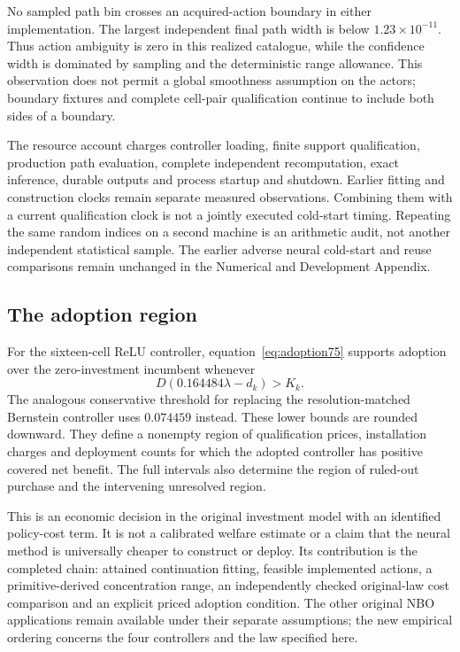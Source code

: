 No sampled path bin crosses an acquired-action boundary in either implementation. The largest independent final path width is below $1.23\times10^{-11}$. Thus action ambiguity is zero in this realized catalogue, while the confidence width is dominated by sampling and the deterministic range allowance. This observation does not permit a global smoothness assumption on the actors; boundary fixtures and complete cell-pair qualification continue to include both sides of a boundary.



The resource account charges controller loading, finite support qualification, production path evaluation, complete independent recomputation, exact inference, durable outputs and process startup and shutdown. Earlier fitting and construction clocks remain separate measured observations. Combining them with a current qualification clock is not a jointly executed cold-start timing. Repeating the same random indices on a second machine is an arithmetic audit, not another independent statistical sample. The earlier adverse neural cold-start and reuse comparisons remain unchanged in the Numerical and Development Appendix.

\subsection{The adoption region}
For the sixteen-cell ReLU controller, equation~\eqref{eq:adoption75} supports adoption over the zero-investment incumbent whenever
\[
 D(0.164484\lambda-d_k)>K_k.
\]
The analogous conservative threshold for replacing the resolution-matched Bernstein controller uses $0.074459$ instead. These lower bounds are rounded downward. They define a nonempty region of qualification prices, installation charges and deployment counts for which the adopted controller has positive covered net benefit. The full intervals also determine the region of ruled-out purchase and the intervening unresolved region.

This is an economic decision in the original investment model with an identified policy-cost term. It is not a calibrated welfare estimate or a claim that the neural method is universally cheaper to construct or deploy. Its contribution is the completed chain: attained continuation fitting, feasible implemented actions, a primitive-derived concentration range, an independently checked original-law cost comparison and an explicit priced adoption condition. The other original NBO applications remain available under their separate assumptions; the new empirical ordering concerns the four controllers and the law specified here.
